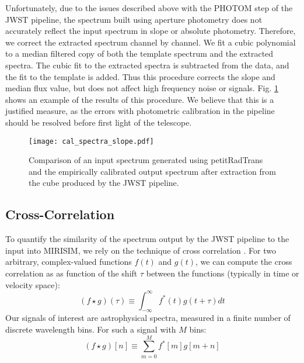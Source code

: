 Unfortunately, due to the issues described above with the PHOTOM step of the JWST pipeline, the spectrum built using aperture photometry does not accurately reflect the input spectrum in slope or absolute photometry. 
Therefore, we correct the extracted spectrum channel by channel. 
We fit a cubic polynomial to a median filtered copy of both the template spectrum and the extracted spectra.
The cubic fit to the extracted spectra is subtracted from the data, and the fit to the template is added. 
Thus this procedure corrects the slope and median flux value, but does not affect high frequency noise or signals.
Fig. \ref{fig:cal} shows an example of the results of this procedure. 
We believe that this is a justified measure, as the errors with photometric calibration in the pipeline should be resolved before first light of the telescope.

\begin{figure}[h]
	\texttt{[image: cal\_spectra\_slope.pdf]}
	\caption{Comparison of an input spectrum generated using petitRadTrans and the empirically calibrated output spectrum after extraction from the cube produced by the JWST pipeline.}
	\label{fig:cal}
\end{figure}

\subsection{Cross-Correlation}
\cite{Snellen2014}%
\cite{Simkin1974} %
\cite{Tonry1979} %
\cite{Petermann2019} %
\cite{Bodis2007} %
To quantify the similarity of the spectrum output by the JWST pipeline to the input into MIRISIM, we rely on the technique of cross correlation \cite{}.
For two arbitrary, complex-valued functions $f(t)$ and $g(t)$, we can compute the cross correlation as as function of the shift $\tau$ between the functions (typically in time or velocity space):
\begin{equation}\label{eqn:crosscorr}
\left(f \star g\right)(\tau) \equiv \int_{-\infty}^{\infty}f^{*}(t)g(t + \tau)dt
\end{equation}
Our signals of interest are astrophysical spectra, measured in a finite number of discrete wavelength bins. For such a signal with $M$ bins:
\begin{equation}\label{eqn:discretecorr}
\left(f \star g\right)[n] \equiv \sum_{m=0}^{M}f^{*}[m]g[m + n]
\end{equation}

